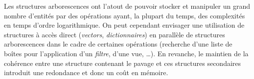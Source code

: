 Les structures arborescences ont l'atout de pouvoir stocker et manipuler un grand nombre d'entités par des opérations ayant, la plupart du temps, des complexités en temps d'ordre logarithmique. On peut cependant envisager une utilisation de structures à accès direct (\emph{vectors}, \emph{dictionnaires}) en parallèle de structures arborescences dans le cadre de certaines opérations (recherche d'une liste de boîtes pour l'application d'un \emph{filtre}, d'une vue, \dots{}). En revanche, le maintien de la cohérence entre une structure contenant le pavage et ces structures \og secondaires \fg{} introduit une redondance et donc un coût en mémoire.



